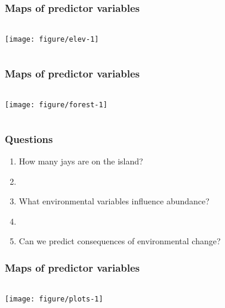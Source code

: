 \documentclass[color=usenames,dvipsnames]{beamer}\usepackage[]{graphicx}\usepackage[]{color}
\begin{document}
\begin{frame}[fragile]
  \frametitle{Maps of predictor variables}
  \scriptsize

\begin{columns}
  \column{\dimexpr\paperwidth-10pt}
  \texttt{[image: figure/elev-1]}
\end{columns}
\end{frame}




\begin{frame}[fragile]
  \frametitle{Maps of predictor variables}
  \scriptsize

\begin{columns}
  \column{\dimexpr\paperwidth-10pt}
  \texttt{[image: figure/forest-1]}
\end{columns}
\end{frame}






\begin{frame}
  \frametitle{Questions}
  \large
  \begin{enumerate}
    \item How many jays are on the island?
    \item[]
    \item What environmental variables influence abundance?
    \item[]
    \item Can we predict consequences of environmental change?
  \end{enumerate}
\end{frame}



\begin{frame}[fragile]
  \frametitle{Maps of predictor variables}

\begin{columns}
  \column{\dimexpr\paperwidth-10pt}
  \texttt{[image: figure/plots-1]}
\end{columns}
\end{frame}
\end{document}
